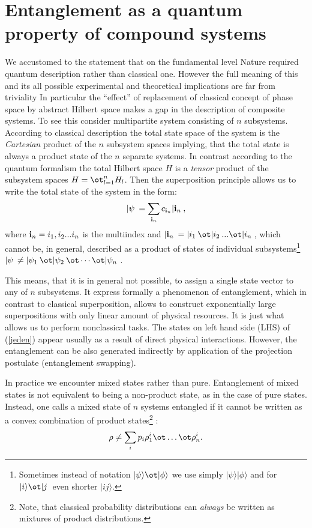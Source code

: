 \documentclass[rmp,12pt,preprint]{revtex4-2}
\begin{document}
\section{ Entanglement as a quantum property of compound systems}
\label{sec:ent_as_prop}
We accustomed to the statement that on the fundamental level Nature
required quantum description rather than classical one. However the
full meaning of this and its all possible experimental and theoretical
implications are far from triviality \cite{Jozsa} In particular the
``effect'' of replacement of classical concept of phase space by
abstract Hilbert space makes a gap in the description of composite
systems. To see this consider multipartite system consisting of $n$
subsystems. According to classical description the total state space
of the system is the {\it Cartesian} product of the $n$ subsystem
spaces implying, that the total state is always a product state of the
$n$ separate systems. In contrast according to the quantum formalism the
total Hilbert space $H$ is a {\it tensor} product of the subsystem
spaces $H=\ot ^n_{l=1}H _l$. Then the superposition principle allows
us to write the total state of the system in the form:
\begin{equation}
  | \psi \>  = \sum_{{ \bf i}_n} c_{{ \bf i}_n}|{{ \bf i}_n}\>,
  \label{jeden}
\end{equation}
where ${{ \bf i}_n} = i_1,i_2...i_n$ is the multiindex and $|{{ \bf
    i}_n}\>= |{i_1}\> {\ot} |{i_2}\>...{\ot}|{i_n}\>$, which cannot
be, in general, described as a product of states of individual
subsystems\footnote{Sometimes instead of notation $|\psi\rangle \ot
  |\phi\rangle$ we use simply $|\psi\rangle |\phi\rangle$ and for
  $|i\rangle \ot |j\>$ even shorter $|ij\rangle$.} $| \psi
\>\neq|\psi_{1}\>\ot|\psi_{2}\>\ot \cdots \ot |\psi_{n}\>$.

This means, that it is in general not possible, to assign a single
state vector to any of $n$ subsystems. It express formally a
phenomenon of entanglement, which in contrast to classical
superposition, allows to construct exponentially large superpositions
with only linear amount of physical resources. It is just what allows
us to perform nonclassical tasks. The states on left hand side (LHS) of
(\ref{jeden}) appear usually as a result of direct physical
interactions. However, the entanglement can be also generated
indirectly by application of the projection postulate (entanglement
swapping).

In practice we encounter mixed states rather than pure. Entanglement
of mixed states is not equivalent to being a non-product state, as in
the case of pure states. Instead, one calls a mixed state of $n$
systems entangled if it cannot be written as a convex combination of
product states\footnote{Note, that classical probability distributions
  can \emph{always} be written as mixtures of product distributions.}
\cite{Werner1989}:
\begin{equation}
\rho\not= \sum_i p_i \rho^i_1 \ot \ldots \ot \rho^i_n.
\end{equation}
\end{document}
